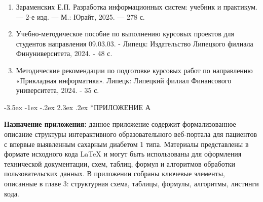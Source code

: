 \documentclass[14pt, a4paper]{extarticle}
\makeatletter
\renewcommand\section{\@startsection {section}{1}{\z@}%
{-3.5ex \@plus -1ex \@minus -.2ex}%
{2.3ex \@plus.2ex}%
{\centering\normalfont\Large\bfseries}}
\makeatother
\begin{document}
\begin{enumerate}
\item Зараменских Е.П. Разработка информационных систем: учебник и практикум. — 2-е изд. — М.: Юрайт, 2025. — 278 с.

\item Учебно-методическое пособие по выполнению курсовых
проектов для студентов направления 09.03.03. - Липецк: Издательство
Липецкого филиала Финуниверситета, 2024. - 48 с.

\item Методические рекомендации по подготовке курсовых работ
по направлению «Прикладная информатика». Липецк: Липецкий филиал
Финансового университета, 2024. - 35 с.
\end{enumerate}

\newpage
{}
\section*{ПРИЛОЖЕНИЕ А}

\noindent \textbf{Назначение приложения:} данное приложение содержит формализованное описание структуры интерактивного образовательного веб-портала для пациентов с впервые выявленным сахарным диабетом 1 типа. Материалы представлены в формате исходного кода \LaTeX{} и могут быть использованы для оформления технической документации, схем, таблиц, формул и алгоритмов обработки пользовательских данных. В приложении собраны ключевые элементы, описанные в главе 3: структурная схема, таблицы, формулы, алгоритмы, листинги кода.
\end{document}
